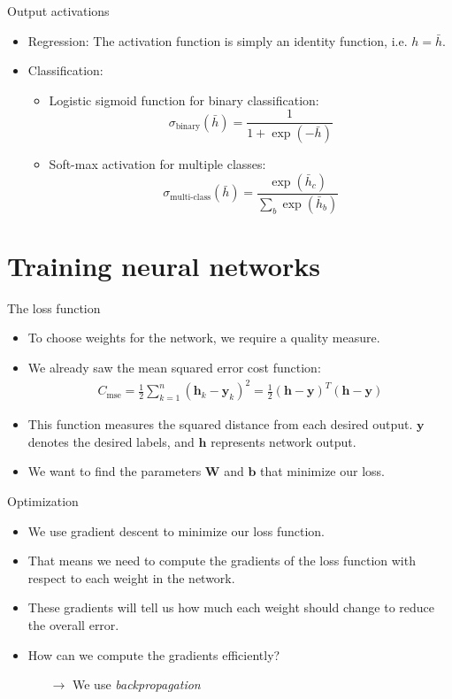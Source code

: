 \documentclass{beamer}
\begin{document}
		\begin{frame}{Output activations}
      \begin{itemize}
				\item Regression: The activation function is simply an identity function, i.e. $h = \bar{h}$.
				\item Classification: 
				\begin{itemize}
					\item Logistic sigmoid function for binary classification: 
						\[\sigma_{\text{binary}}(\bar{h}) = \frac{1}{1+\exp(-\bar{h})}\]
					\item  Soft-max activation for multiple classes: 
					\[ \sigma_{\text{multi-class}}(\bar{h}) = \frac{\exp(\bar{h}_c)}{\sum_b\exp(\bar{h}_b)}\]
				\end{itemize}
			\end{itemize}
    \end{frame}
		
		\section{Training neural networks}

    \begin{frame}{The loss function}
		\begin{itemize}
      \item To choose weights for the network, we require a quality measure.
      \item We already saw the mean squared error cost function:
      \begin{align}
        C_{\text{mse}} = \frac{1}{2} \sum_{k=1}^{n} (\mathbf{h}_k - \mathbf{y}_k)^2 = \frac{1}{2} (\mathbf{h} - \mathbf{y})^T(\mathbf{h} - \mathbf{y})
      \end{align}
      \item This function measures the squared distance from each desired output.
      $\mathbf{y}$ denotes the desired labels, and $\mathbf{h}$ represents network output.
			\item We want to find the parameters $\mathbf{W}$ and $\mathbf{b}$ that minimize our loss. 
			\end{itemize}
    \end{frame}
		
		\begin{frame}{Optimization}
      \begin{itemize}
      \item We use gradient descent to minimize our loss function.
			\item That means we need to compute the gradients of the loss function with respect to each weight in the network. 
			\item These gradients will tell us how much each weight should change to reduce the overall error.
			\item How can we compute the gradients efficiently?
			\begin{itemize}
				\item[$\rightarrow$] We use \emph{backpropagation}
			\end{itemize}
			\end{itemize}
    \end{frame}
		
\end{document}
